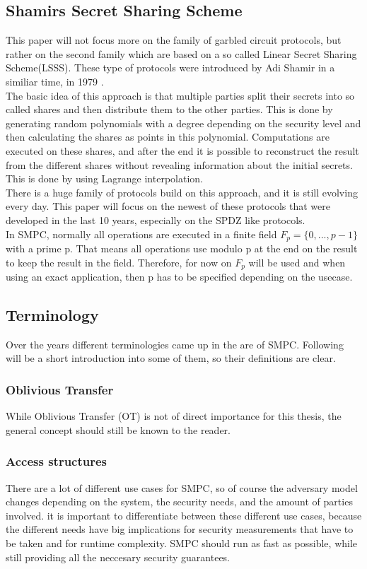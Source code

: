 \documentclass[english,runningheads,a4paper]{llncs}[2018/03/10]
\begin{document}
\subsection{Shamirs Secret Sharing Scheme}
This paper will not focus more on the family of garbled circuit protocols, but rather on the second family which are based on a so called Linear Secret Sharing Scheme(LSSS). 
These type of protocols were introduced by Adi Shamir in a similiar time, in 1979 \cite{Shamir:1979:SS:359168.359176}.\\
The basic idea of this approach is that multiple parties split their secrets into so called shares and then distribute them to the other parties. This is done by generating random polynomials with a degree depending on the security level and then calculating the shares as points in this polynomial. Computations are executed on these shares, and after the end it is possible to reconstruct the result from the different shares without revealing information about the initial secrets. This is done by using Lagrange interpolation.\\
 There is a huge family of protocols build on this approach, and it is still evolving every day. This paper will focus on the newest of these protocols that were developed in the last 10 years, especially on the SPDZ like protocols.\\
In SMPC, normally all operations are executed in a finite field \(F_p = \{ 0,...,p-1\}\) with a prime p. That means all operations use modulo p at the end on the result to keep the result in the field. Therefore, for now on \(F_p\) will be used and when using an exact application, then p has to be specified depending on the usecase.\\


\subsection{Terminology}
Over the years different terminologies came up in the are of SMPC. Following will be a short introduction into some of them, so their definitions are clear.

\subsubsection{Oblivious Transfer}
While Oblivious Transfer (OT) is not of direct importance for this thesis, the general concept should still be known to the reader. 

\subsubsection{Access structures}
There are a lot of different use cases for SMPC, so of course the adversary model changes depending on the system, the security needs, and the amount of parties involved. it is important to differentiate between these different use cases, because the different needs have big implications for security measurements that have to be taken and for runtime complexity. SMPC should run as fast as possible, while still providing all the neccesary security guarantees.
\end{document}
